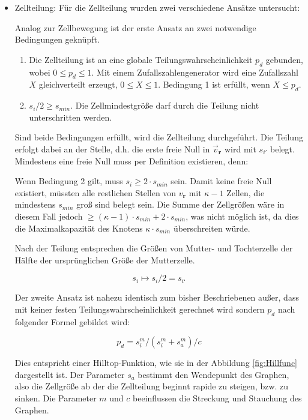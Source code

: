 \documentclass[11pt,a4paper,pointlessnumbers]{scrreprt}  %
\begin{document}
\begin{itemize}
	\item Zellteilung: Für die Zellteilung wurden zwei verschiedene Ansätze untersucht: 
	\par Analog zur Zellbewegung ist der erste Ansatz an zwei notwendige Bedingungen geknüpft.
	
	\begin{enumerate}
		\item Die Zellteilung ist an eine globale Teilungswahrscheinlichkeit $p_{d}$ gebunden, wobei $0 \leq p_{d} \leq 1$. Mit einem Zufallszahlengenerator wird eine Zufallszahl $X$ gleichverteilt erzeugt, $0 \leq X \leq 1$. Bedingung 1 ist erfüllt, wenn $X \leq p_{d}$.
		
		\item $s_{i}/2 \geq s_{min}$. Die Zellmindestgröße darf durch die Teilung nicht unterschritten werden. 
	\end{enumerate}

	Sind beide Bedingungen erfüllt, wird die Zellteilung durchgeführt. Die Teilung erfolgt dabei an der Stelle, d.h. die erste freie Null in $\vec{v}_{\boldsymbol{r}}$ wird mit $s_{i'}$ belegt. Mindestens eine freie Null muss per Definition existieren, denn:\par 
	Wenn Bedingung 2 gilt, muss $s_{i} \geq 2 \cdot s_{min}$ sein. Damit keine freie Null existiert, müssten alle restlichen Stellen von $v_{\boldsymbol{r}}$ mit $\kappa - 1$ Zellen, die mindestens $s_{min}$ groß sind belegt sein. Die Summe der Zellgrößen wäre in diesem Fall jedoch $\geq (\kappa-1) \cdot s_{min} + 2 \cdot s_{min}$, was nicht möglich ist, da dies die Maximalkapazität des Knotens $\kappa \cdot s_{min}$ überschreiten würde.
	
	
	Nach der Teilung entsprechen die Größen von Mutter- und Tochterzelle der Hälfte der ursprünglichen Größe der Mutterzelle.
	
	\[
	s_{i} \mapsto s_{i}/2 = s_{i‘}
	\]
	
	Der zweite Ansatz ist nahezu identisch zum bisher Beschriebenen außer, dass mit keiner festen Teilungswahrscheinlichkeit gerechnet wird sondern $p_{d}$ nach folgender Formel gebildet wird:
	
	\[
	p_{d} = s_{i}^m/(s_{i}^m+s_{a}^m)/c
	\]
	
	Dies entspricht einer Hilltop-Funktion, wie sie in der Abbildung \ref{fig:Hillfunc} dargestellt ist. Der Parameter $s_{a}$ bestimmt den Wendepunkt des Graphen, also die Zellgröße ab der die Zellteilung beginnt rapide zu steigen, bzw. zu sinken. Die Parameter $m$ und $c$ beeinflussen die Streckung und Stauchung des Graphen. 
	
\end{itemize}
\end{document}
